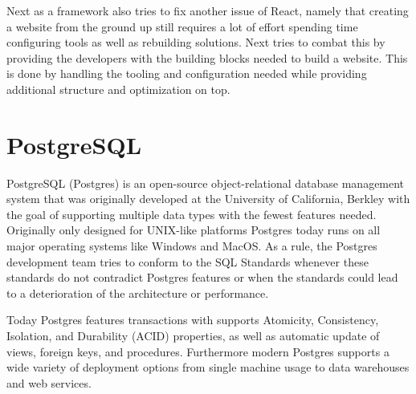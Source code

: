Next as a framework also tries to fix another issue of React, namely that creating a website from the ground up still requires a lot of effort spending time configuring tools as well as rebuilding solutions. 
Next tries to combat this by providing the developers with the building blocks needed to build a website.
This is done by handling the tooling and configuration needed while providing additional structure and optimization on top\cite{Nextjs_Docks}.


\section*{PostgreSQL}
PostgreSQL (Postgres) is an open-source object-relational database management system that was originally developed at the University of California, Berkley with the goal of supporting multiple data types with the fewest features needed. Originally only designed for UNIX-like platforms Postgres today runs on all major operating systems like Windows and MacOS\cite{Postgres_Docs}.
As a rule, the Postgres development team tries to conform to the SQL Standards whenever these standards do not contradict Postgres features or when the standards could lead to a deterioration of the architecture or performance\cite{Postgres_Docs}. 

Today Postgres features transactions with supports Atomicity, Consistency, Isolation, and Durability (ACID) properties, as well as automatic update of views, foreign keys, and procedures. 
Furthermore modern Postgres supports a wide variety of deployment options from single machine usage to data warehouses and web services\cite{Postgres_Docs}.




